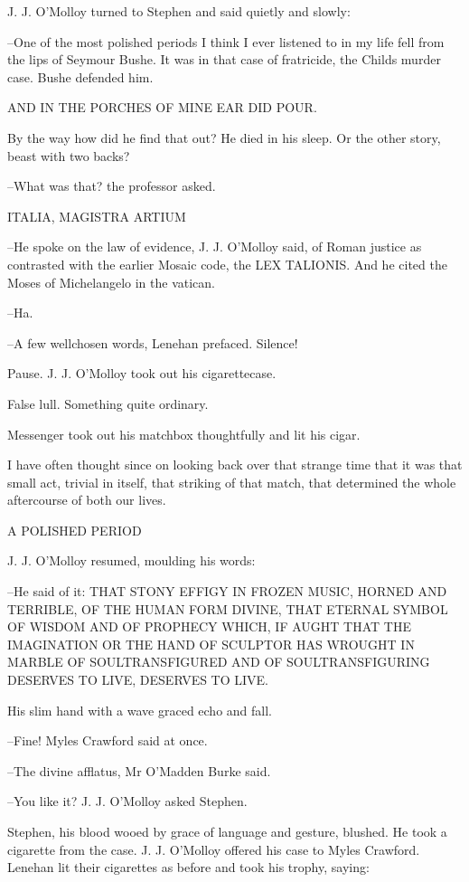 J. J. O'Molloy turned to Stephen and said quietly and slowly:

--One of the most polished periods I think I ever listened to in my life
fell from the lips of Seymour Bushe. It was in that case of fratricide,
the Childs murder case. Bushe defended him.


    AND IN THE PORCHES OF MINE EAR DID POUR.


By the way how did he find that out? He died in his sleep. Or the
other story, beast with two backs?

--What was that? the professor asked.


    ITALIA, MAGISTRA ARTIUM


--He spoke on the law of evidence, J. J. O'Molloy said, of Roman justice
as contrasted with the earlier Mosaic code, the LEX TALIONIS. And he cited
the Moses of Michelangelo in the vatican.

--Ha.

--A few wellchosen words, Lenehan prefaced. Silence!

Pause. J. J. O'Molloy took out his cigarettecase.

False lull. Something quite ordinary.

Messenger took out his matchbox thoughtfully and lit his cigar.

I have often thought since on looking back over that strange time that
it was that small act, trivial in itself, that striking of that match,
that determined the whole aftercourse of both our lives.


    A POLISHED PERIOD


J. J. O'Molloy resumed, moulding his words:

--He said of it: THAT STONY EFFIGY IN FROZEN MUSIC, HORNED AND TERRIBLE,
OF THE HUMAN FORM DIVINE, THAT ETERNAL SYMBOL OF WISDOM AND OF PROPHECY
WHICH, IF AUGHT THAT THE IMAGINATION OR THE HAND OF SCULPTOR HAS WROUGHT
IN MARBLE OF SOULTRANSFIGURED AND OF SOULTRANSFIGURING DESERVES TO LIVE,
DESERVES TO LIVE.

His slim hand with a wave graced echo and fall.

--Fine! Myles Crawford said at once.

--The divine afflatus, Mr O'Madden Burke said.

--You like it? J. J. O'Molloy asked Stephen.

Stephen, his blood wooed by grace of language and gesture, blushed.
He took a cigarette from the case. J. J. O'Molloy offered his case to
Myles Crawford. Lenehan lit their cigarettes as before and took his
trophy, saying:


